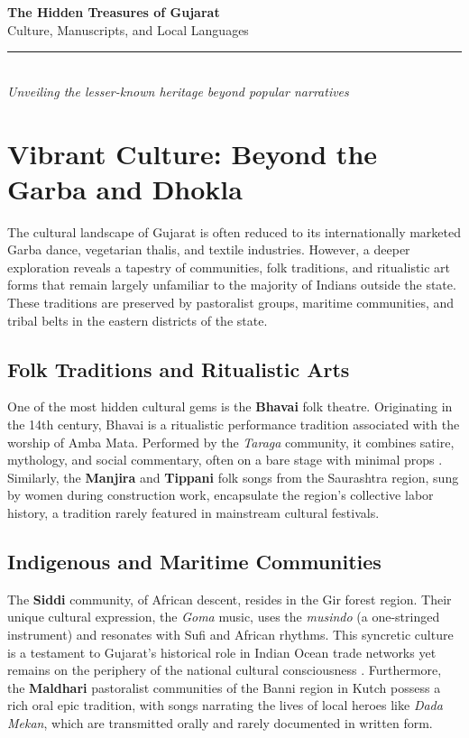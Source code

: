 \documentclass[12pt]{article}
\begin{document}
\begin{center}
    {\huge \textbf{The Hidden Treasures of Gujarat}} \\[0.5cm]
    {\large Culture, Manuscripts, and Local Languages} \\[0.2cm]
    \rule{0.9\textwidth}{0.4pt} \\[0.3cm]
    \textit{Unveiling the lesser-known heritage beyond popular narratives}
\end{center}

\tableofcontents
\newpage

\section{Vibrant Culture: Beyond the Garba and Dhokla}
The cultural landscape of Gujarat is often reduced to its internationally marketed Garba dance, vegetarian thalis, and textile industries. However, a deeper exploration reveals a tapestry of communities, folk traditions, and ritualistic art forms that remain largely unfamiliar to the majority of Indians outside the state. These traditions are preserved by pastoralist groups, maritime communities, and tribal belts in the eastern districts of the state.

\subsection{Folk Traditions and Ritualistic Arts}
One of the most hidden cultural gems is the \textbf{Bhavai} folk theatre. Originating in the 14th century, Bhavai is a ritualistic performance tradition associated with the worship of Amba Mata. Performed by the \textit{Taraga} community, it combines satire, mythology, and social commentary, often on a bare stage with minimal props \cite{shah2006}. Similarly, the \textbf{Manjira} and \textbf{Tippani} folk songs from the Saurashtra region, sung by women during construction work, encapsulate the region's collective labor history, a tradition rarely featured in mainstream cultural festivals.

\subsection{Indigenous and Maritime Communities}
The \textbf{Siddi} community, of African descent, resides in the Gir forest region. Their unique cultural expression, the \textit{Goma} music, uses the \textit{musindo} (a one-stringed instrument) and resonates with Sufi and African rhythms. This syncretic culture is a testament to Gujarat's historical role in Indian Ocean trade networks yet remains on the periphery of the national cultural consciousness \cite{basu2008}. Furthermore, the \textbf{Maldhari} pastoralist communities of the Banni region in Kutch possess a rich oral epic tradition, with songs narrating the lives of local heroes like \textit{Dada Mekan}, which are transmitted orally and rarely documented in written form.
\end{document}
